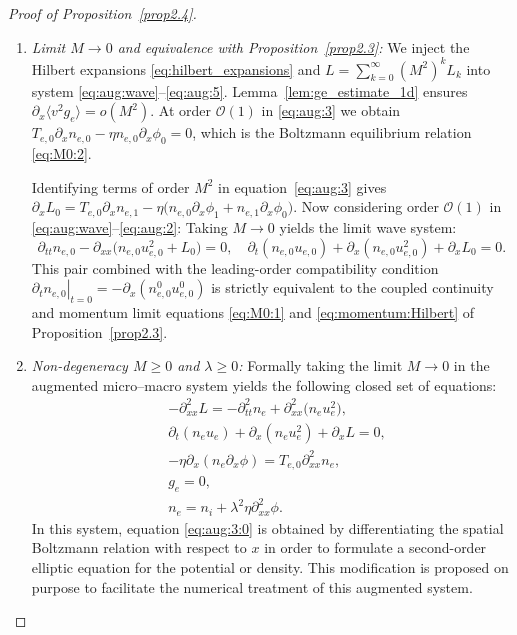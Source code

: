 \documentclass[pdflatex,final,10pt]{article}
\newcommand{\Del}[1]{#1}
\begin{document}
\begin{proof}[Proof of Proposition~\ref{prop2.4}]
\begin{enumerate}
\begin{equation*}
    M^2 \Big( \partial_t (n_e u_e) + \partial_x (n_e u_e^2) \Big) + T_{e,0} \partial_x n_e - \eta n_e \partial_x \phi + \partial_x \langle v^2 g_e \rangle = 0.
\end{equation*}
This establishes strict equivalence with the original micro--macro model for all $M > 0$.
\item \emph{Limit $M \to 0$ and equivalence with Proposition~\ref{prop2.3}:}
We inject the Hilbert expansions \eqref{eq:hilbert_expansions} and $L = \sum_{k=0}^\infty (M^2)^k L_k$ into system \eqref{eq:aug:wave}--\eqref{eq:aug:5}. Lemma~\ref{lem:ge_estimate_1d} ensures $\partial_x \langle v^2 g_e \rangle = o(M^2)$.
At order $\mathcal{O}(1)$ in \eqref{eq:aug:3} we obtain $T_{e,0} \partial_x n_{e,0} - \eta n_{e,0} \partial_x \phi_0 = 0$, which is the Boltzmann equilibrium relation \eqref{eq:M0:2}.

Identifying terms of order $M^2$  in equation~\eqref{eq:aug:3} gives $\partial_x L_0 = T_{e,0} \partial_x n_{e,1} - \eta \big( n_{e,0} \partial_x \phi_1 + n_{e,1} \partial_x \phi_0 \big)$. 
Now considering order $\mathcal{O}(1)$ in \eqref{eq:aug:wave}--\eqref{eq:aug:2}: Taking $M \to 0$ yields the limit wave system:
    \begin{equation*}
        \partial_{tt} n_{e,0} - \partial_{xx} \big( n_{e,0} u_{e,0}^2 + L_0 \big) = 0, \quad \partial_t (n_{e,0} u_{e,0}) + \partial_x (n_{e,0} u_{e,0}^2) + \partial_x L_0 = 0.
    \end{equation*}
    This pair combined with the leading-order compatibility condition $\left. \partial_t n_{e,0} \right|_{t=0} = -\partial_x (n_{e,0}^0 u_{e,0}^0)$ is strictly equivalent to the coupled continuity and momentum limit equations \eqref{eq:M0:1} and \eqref{eq:momentum:Hilbert} of Proposition~\ref{prop2.3}.
\item \Del{\emph{Non-degeneracy $M \ge 0$ and $\lambda \ge 0$:}} Formally taking the limit $M \to 0$ in the augmented micro--macro system yields the following closed set of equations:
\begin{align}
    &-\partial^2_{xx} L = -\partial^2_{tt} n_e +\partial^2_{xx} \big( n_e u_e^2 \big), \label{eq:aug:wave:0}\\
    &\partial_t (n_e u_e) + \partial_x (n_e u_e^2) + \partial_x L = 0, \label{eq:aug:2:0}\\
    &- \eta \partial_x \left( n_e \partial_x \phi\right) = T_{e,0} \partial^2_{xx} n_e, \label{eq:aug:3:0}\\
    &g_e = 0, \label{eq:aug:4:0}\\
    &n_e = n_i + \lambda^2 \eta \partial^2_{xx} \phi. \label{eq:aug:5:0}
\end{align}
In this system, equation \eqref{eq:aug:3:0} is obtained by differentiating the spatial Boltzmann relation with respect to $x$ in order to formulate a second-order elliptic equation for the potential or density. This modification is proposed on purpose to facilitate the numerical treatment of this augmented system. 


\end{enumerate}
\end{proof}
\end{document}
